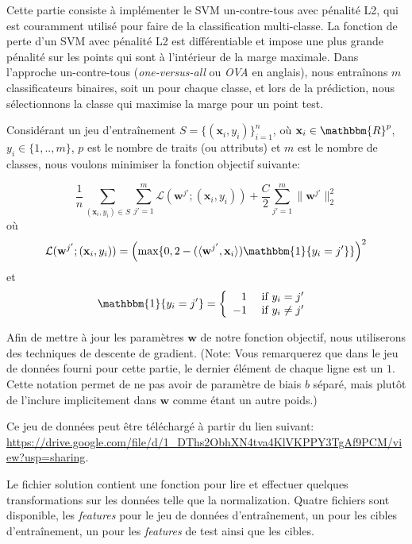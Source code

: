 {}{
Cette partie consiste à implémenter le SVM un-contre-tous avec pénalité L2, qui est couramment utilisé pour faire de la classification multi-classe. La fonction de perte d'un SVM avec pénalité L2 est différentiable et impose une plus grande pénalité sur les points qui sont à l'intérieur de la marge maximale. Dans l'approche un-contre-tous (\textit{one-versus-all} ou \textit{OVA} en anglais), nous entraînons $m$ classificateurs binaires, soit un pour chaque classe, et lors de la prédiction, nous sélectionnons la classe qui maximise la marge pour un point test.

Considérant un jeu d'entraînement $S = \{(\mathbf{x}_i, y_i) \}_{i=1}^n$, où $\mathbf{x}_i \in \mathbbm{R}^p$, $y_i \in \{1,..,m\}$, $p$ est le nombre de traits (ou attributs) et $m$ est le nombre de classes, nous voulons minimiser la fonction objectif suivante:

\begin{equation*}
	\frac{1}{n}\sum_{(\mathbf{x}_i, y_i) \in S} \sum_{j'=1}^{m} \mathcal{L}(\mathbf{w}^{j'}; (\mathbf{x}_i, y_i)) + \frac{C}{2}\sum_{j'=1}^{m} \lVert \mathbf{w}^{j'} \rVert_2^2
\end{equation*}
où
\begin{equation*}
	\mathcal{L}(\mathbf{w}^{j'}; (\mathbf{x}_i, y_i)) = \left(\text{max}\{0, 2 - (\langle \mathbf{w}^{j'}, \mathbf{x}_i \rangle)\mathbbm{1}\{y_i=j'\}  \} \right)^2
\end{equation*}
et
\begin{equation*}
	\mathbbm{1}\{y_i=j'\} = \left\{ \begin{array}{rl}
		1  & \mbox{ if $y_i=j'$ }      \\
		-1 & \mbox{ if $y_i \neq j'$ }
	\end{array} \right.
\end{equation*}

Afin de mettre à jour les paramètres $\mathbf{w}$ de notre fonction objectif, nous utiliserons des techniques de descente de gradient. (Note: Vous remarquerez que dans le jeu de données fourni pour cette partie, le dernier élément de chaque ligne est un $1$. Cette notation permet de ne pas avoir de paramètre de biais $b$ séparé, mais plutôt de l'inclure implicitement dans $\mathbf{w}$ comme étant un autre poids.)

Ce jeu de données peut être téléchargé à partir du lien suivant: \url{https://drive.google.com/file/d/1_DThs2ObhXN4tva4KlVKPPY3TgAf9PCM/view?usp=sharing}.
}
Le fichier solution contient une fonction pour lire et effectuer quelques transformations sur les données telle que la normalization. Quatre fichiers sont disponible, les \textit{features} pour le jeu de données d'entraînement, un pour les cibles d'entraînement, un pour les \textit{features} de test ainsi que les cibles.
